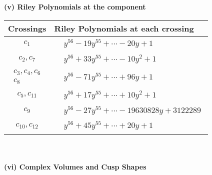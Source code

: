 \documentclass[1p]{elsarticle_modified}
\theoremstyle{definition}
\begin{document}
\newpage\renewcommand{\arraystretch}{1}
\flushleft \textbf{(v) Riley Polynomials at the component}\newline \\
\begin{tabular}{m{50pt}|m{274pt}}
Crossings & \hspace{64pt}Riley Polynomials at each crossing \\
\hline $$\begin{aligned}c_{1}\end{aligned}$$&$\begin{aligned}
&y^{56}-19 y^{55}+\cdots-20 y+1
\end{aligned}$\\
\hline $$\begin{aligned}c_{2},c_{7}\end{aligned}$$&$\begin{aligned}
&y^{56}+33 y^{55}+\cdots-10 y^2+1
\end{aligned}$\\
\hline $$\begin{aligned}c_{3},c_{4},c_{6}\\c_{8}\end{aligned}$$&$\begin{aligned}
&y^{56}-71 y^{55}+\cdots+96 y+1
\end{aligned}$\\
\hline $$\begin{aligned}c_{5},c_{11}\end{aligned}$$&$\begin{aligned}
&y^{56}+17 y^{55}+\cdots+10 y^2+1
\end{aligned}$\\
\hline $$\begin{aligned}c_{9}\end{aligned}$$&$\begin{aligned}
&y^{56}-27 y^{55}+\cdots-19630828 y+3122289
\end{aligned}$\\
\hline $$\begin{aligned}c_{10},c_{12}\end{aligned}$$&$\begin{aligned}
&y^{56}+45 y^{55}+\cdots+20 y+1
\end{aligned}$\\
\hline
\end{tabular}\\~\\
\newpage\flushleft \textbf{(vi) Complex Volumes and Cusp Shapes}
\end{document}
